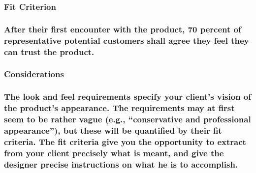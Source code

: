 \documentclass[
]{article}
\begin{document}
\hypertarget{fit-criterion-2}{%
\subsubsection{Fit Criterion}\label{fit-criterion-2}}

\hypertarget{after-their-first-encounter-with-the-product-70-percent-of-representative-potential-customers-shall-agree-they-feel-they-can-trust-the-product.}{%
\subsubsection{\texorpdfstring{After their first encounter with the
product, 70 percent of representative potential customers shall agree
they feel they can trust the product.
}{After their first encounter with the product, 70 percent of representative potential customers shall agree they feel they can trust the product. }}\label{after-their-first-encounter-with-the-product-70-percent-of-representative-potential-customers-shall-agree-they-feel-they-can-trust-the-product.}}

\hypertarget{considerations-19}{%
\subsubsection{Considerations}\label{considerations-19}}

\hypertarget{the-look-and-feel-requirements-specify-your-clients-vision-of-the-products-appearance.-the-requirements-may-at-first-seem-to-be-rather-vague-e.g.-conservative-and-professional-appearance-but-these-will-be-quantified-by-their-fit-criteria.-the-fit-criteria-give-you-the-opportunity-to-extract-from-your-client-precisely-what-is-meant-and-give-the-designer-precise-instructions-on-what-he-is-to-accomplish.}{%
\subsubsection{\texorpdfstring{The look and feel requirements specify
your client's vision of the product's appearance. The requirements may
at first seem to be rather vague (e.g., ``conservative and professional
appearance''), but these will be quantified by their fit criteria. The
fit criteria give you the opportunity to extract from your client
precisely what is meant, and give the designer precise instructions on
what he is to accomplish.
}{The look and feel requirements specify your client's vision of the product's appearance. The requirements may at first seem to be rather vague (e.g., ``conservative and professional appearance''), but these will be quantified by their fit criteria. The fit criteria give you the opportunity to extract from your client precisely what is meant, and give the designer precise instructions on what he is to accomplish. }}\label{the-look-and-feel-requirements-specify-your-clients-vision-of-the-products-appearance.-the-requirements-may-at-first-seem-to-be-rather-vague-e.g.-conservative-and-professional-appearance-but-these-will-be-quantified-by-their-fit-criteria.-the-fit-criteria-give-you-the-opportunity-to-extract-from-your-client-precisely-what-is-meant-and-give-the-designer-precise-instructions-on-what-he-is-to-accomplish.}}
\end{document}
